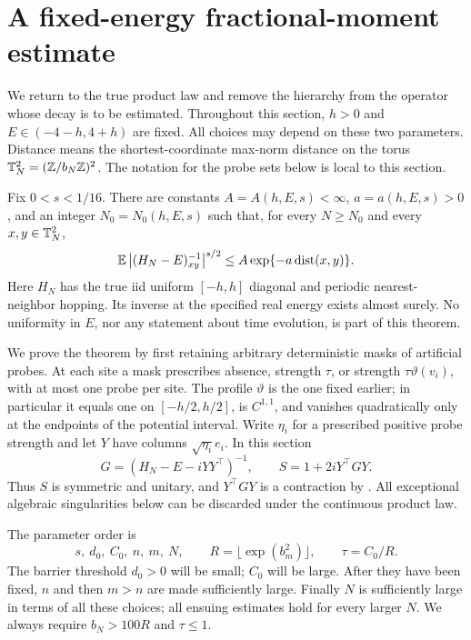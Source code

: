 \section{A fixed-energy fractional-moment estimate}
\label{sec:bootstrap}

We return to the true product law and remove the hierarchy from the
operator whose decay is to be estimated. Throughout this section,
\(h>0\) and \(E\in(-4-h,4+h)\) are fixed. All choices may depend on
these two parameters. Distance means the shortest-coordinate max-norm
distance on the torus \(\mathbb T_N^2=(\mathbb Z/b_N\mathbb Z)^2\). The notation for the probe
sets below is local to this section.

\begin{theorem}\label{boot:fractional}
Fix \(0<s<1/16\). There are constants
\(A=A(h,E,s)<\infty\), \(a=a(h,E,s)>0\), and an integer
\(N_0=N_0(h,E,s)\) such that, for every \(N\ge N_0\) and every
\(x,y\in\mathbb T_N^2\),
\begin{equation}\label{boot:real-decay}
 \mathbb E\left\lvert(H_N-E)^{-1}_{xy}\right\rvert^{s/2}
       \le A\exp\{-a\operatorname{dist}(x,y)\}.
\end{equation}
Here \(H_N\) has the true iid uniform \([-h,h]\) diagonal and periodic
nearest-neighbor hopping. Its inverse at the specified real energy
exists almost surely. No uniformity in \(E\), nor any statement about
time evolution, is part of this theorem.
\end{theorem}

We prove the theorem by first retaining arbitrary deterministic masks of
artificial probes. At each site a mask prescribes absence, strength
\(\tau\), or strength \(\tau\vartheta(v_i)\), with at most one probe per
site. The profile \(\vartheta\) is the one fixed earlier; in particular
it equals one on \([-h/2,h/2]\), is \(C^{1,1}\), and vanishes quadratically
only at the endpoints of the potential interval. Write
\(\eta_i\) for a prescribed positive probe strength and let \(Y\) have
columns \(\sqrt{\eta_i}e_i\). In this section
\[
 G=(H_N-E-iYY^\top)^{-1},\qquad S=1+2iY^\top GY.
\]
Thus \(S\) is symmetric and unitary, and \(Y^\top GY\) is a
contraction by . All exceptional algebraic singularities
below can be discarded under the continuous product law.

The parameter order is
\begin{equation}\label{boot:order}
 s,\ d_0,\ C_0,\ n,\ m,\ N,
 \qquad R=\lfloor\exp(b_m^2)\rfloor,\qquad \tau=C_0/R.
\end{equation}
The barrier threshold \(d_0>0\) will be small; \(C_0\) will be large.
After they have been fixed, \(n\) and then \(m>n\) are made sufficiently
large. Finally \(N\) is sufficiently large in terms of all these
choices; all ensuing estimates hold for every larger \(N\). We always
require \(b_N>100R\) and \(\tau\le1\).

